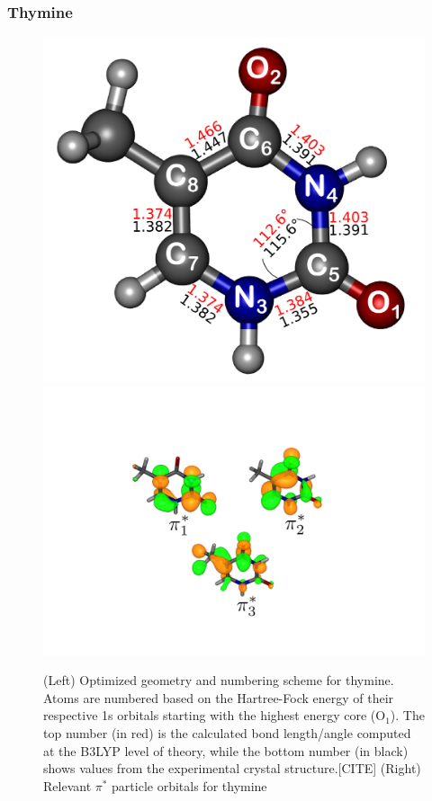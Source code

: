 \documentclass[11.5pt]{article}
\begin{document}
\subsubsection{Thymine}
  \begin{figure}[ht!]
  \includegraphics[scale=0.60]{g130.png} \includegraphics[scale=0.4]{particleorbitals.png}
  \caption{(Left) Optimized geometry and numbering scheme for thymine. Atoms are numbered based on the Hartree-Fock energy of their respective 1s orbitals starting with the highest energy core (O$_1$). The top number (in red) is the calculated bond length/angle computed at the B3LYP level of theory, while the bottom number (in black) shows values from the experimental crystal structure.[CITE] (Right) Relevant $\pi^*$ particle orbitals for thymine}
  \end{figure}
\end{document}
